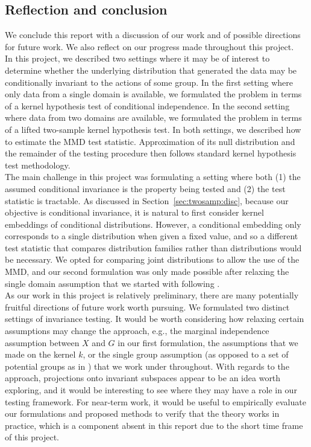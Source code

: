 \subsection{Reflection and conclusion} \label{sec:discussion}

We conclude this report with a discussion of our work and of possible directions for future work. We also reflect on our progress made throughout this project.
\\

In this project, we described two settings where it may be of interest to determine whether the underlying distribution that generated the data may be conditionally invariant to the actions of some group. In the first setting where only data from a single domain is available, we formulated the problem in terms of a kernel hypothesis test of conditional independence. In the second setting where data from two domains are available, we formulated the problem in terms of a lifted two-sample kernel hypothesis test. In both settings, we described how to estimate the MMD test statistic. Approximation of its null distribution and the remainder of the testing procedure then follows standard kernel hypothesis test methodology.
\\

The main challenge in this project was formulating a setting where both (1) the assumed conditional invariance is the property being tested and (2) the test statistic is tractable. As discussed in Section~\ref{sec:twosamp:disc}, because our objective is conditional invariance, it is natural to first consider kernel embeddings of conditional distributions. However, a conditional embedding only corresponds to a single distribution when given a fixed value, and so a different test statistic that compares distribution families rather than distributions would be necessary. We opted for comparing joint distributions to allow the use of the MMD, and our second formulation was only made possible after relaxing the single domain assumption that we started with following \textcite{Mouli:2021}.
\\

As our work in this project is relatively preliminary, there are many potentially fruitful directions of future work worth pursuing. We formulated two distinct settings of invariance testing. It would be worth considering how relaxing certain assumptions may change the approach, e.g., the marginal independence assumption between $X$ and $G$ in our first formulation, the assumptions that we made on the kernel $k$, or the single group assumption (as opposed to a set of potential groups as in \parencite{Mouli:2021}) that we work under throughout. With regards to the approach, projections onto invariant subspaces \parencite{Elesedy:2021:equivariant,Elesedy:2021,Mouli:2021} appear to be an idea worth exploring, and it would be interesting to see where they may have a role in our testing framework. For near-term work, it would be useful to empirically evaluate our formulations and proposed methods to verify that the theory works in practice, which is a component absent in this report due to the short time frame of this project.


